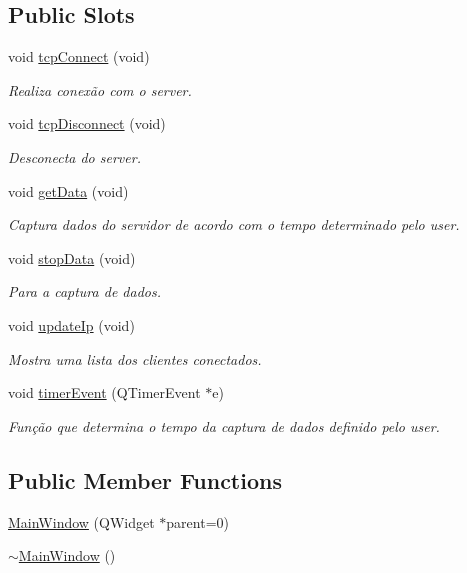 \subsection*{Public Slots}
\begin{DoxyCompactItemize}
\item 
void \mbox{\hyperlink{class_main_window_a26b6030035e196b64333906db8302cdd}{tcp\+Connect}} (void)
\begin{DoxyCompactList}\small\item\em Realiza conexão com o server. \end{DoxyCompactList}\item 
void \mbox{\hyperlink{class_main_window_a3389bbbe4222f115a7609037a1a63bd5}{tcp\+Disconnect}} (void)
\begin{DoxyCompactList}\small\item\em Desconecta do server. \end{DoxyCompactList}\item 
void \mbox{\hyperlink{class_main_window_ac6d3a5fa8ef8ede69436b9e9a6ee80c1}{get\+Data}} (void)
\begin{DoxyCompactList}\small\item\em Captura dados do servidor de acordo com o tempo determinado pelo user. \end{DoxyCompactList}\item 
void \mbox{\hyperlink{class_main_window_a2e3dceeb08f18cc1d07e42b79fe7a0c1}{stop\+Data}} (void)
\begin{DoxyCompactList}\small\item\em Para a captura de dados. \end{DoxyCompactList}\item 
void \mbox{\hyperlink{class_main_window_a6d5ab019a97676b4edfe7d4b6a541455}{update\+Ip}} (void)
\begin{DoxyCompactList}\small\item\em Mostra uma lista dos clientes conectados. \end{DoxyCompactList}\item 
void \mbox{\hyperlink{class_main_window_a9d08a694a5f9c532225754381b8011ea}{timer\+Event}} (Q\+Timer\+Event $\ast$e)
\begin{DoxyCompactList}\small\item\em Função que determina o tempo da captura de dados definido pelo user. \end{DoxyCompactList}\end{DoxyCompactItemize}
\subsection*{Public Member Functions}
\begin{DoxyCompactItemize}
\item 
\mbox{\hyperlink{class_main_window_a8b244be8b7b7db1b08de2a2acb9409db}{Main\+Window}} (Q\+Widget $\ast$parent=0)
\item 
\mbox{\hyperlink{class_main_window_ae98d00a93bc118200eeef9f9bba1dba7}{$\sim$\+Main\+Window}} ()
\end{DoxyCompactItemize}


